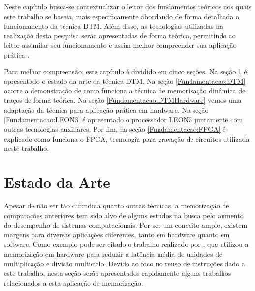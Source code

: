 \label{Fundamentacao}
%
%
%

Neste capítulo busca-se contextualizar o leitor dos fundamentos teóricos nos quais este trabalho se baseia, mais especificamente abordando de forma detalhada o funcionamento da técnica DTM. Além disso, as tecnologias utilizadas na realização desta pesquisa serão apresentadas de forma teórica, permitindo ao leitor assimilar seu funcionamento e assim melhor compreender sua aplicação prática
.

Para melhor compreensão, este capítulo é dividido em cinco seções. Na seção \ref{Fundamentacao:EstadoArte} é apresentado o estado da arte da técnica DTM. Na seção \ref{Fundamentacao:DTM} ocorre a demonstração de como funciona a técnica de memorização dinâmica de traços de forma teórica. Na seção \ref{Fundamentacao:DTMHardware} vemos uma adaptação da técnica para aplicação prática em hardware. Na seção \ref{Fundamentacao:LEON3} é apresentado o processador LEON3 juntamente com outras tecnologias auxiliares. Por fim, na seção \ref{Fundamentacao:FPGA} é explicado como funciona o FPGA, tecnologia para gravação de circuitos utilizada neste trabalho.

\section{Estado da Arte}
\label{Fundamentacao:EstadoArte}

Apesar de não ser tão difundida quanto outras técnicas, a memorização de computações anteriores tem sido alvo de alguns estudos na busca pelo aumento do desempenho de sistemas computacionais. Por ser um conceito amplo, existem margens para diversas aplicações diferentes, tanto em hardware quanto em software. Como exemplo pode ser citado o trabalho realizado por \cite{citron1998accelerating}, que utilizou a memorização em hardware para reduzir a latência média de unidades de multiplicação e divisão multiciclo. Devido ao foco no reuso de instruções dado a este trabalho, nesta seção serão apresentados rapidamente alguns trabalhos relacionados a esta aplicação de memorização.

